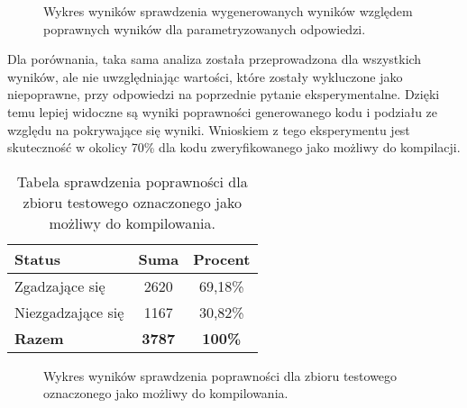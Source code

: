 \begin{figure}[H]
\centering
{}
\caption{Wykres wyników sprawdzenia wygenerowanych wyników względem poprawnych wyników dla parametryzowanych odpowiedzi.}\label{rys:plama2f}
\end{figure}

Dla porównania, taka sama analiza została przeprowadzona dla wszystkich wyników, ale nie uwzględniając wartości, które zostały wykluczone jako niepoprawne, przy odpowiedzi na poprzednie pytanie eksperymentalne. Dzięki temu lepiej widoczne są wyniki poprawności generowanego kodu i podziału ze względu na pokrywające się wyniki. Wnioskiem z tego eksperymentu jest skuteczność w okolicy 70\% dla kodu zweryfikowanego jako możliwy do kompilacji.

\begin{table}[ht]
\caption{Tabela sprawdzenia poprawności dla zbioru testowego oznaczonego jako możliwy do kompilowania.}\label{tab:tabela7}
\centering%
\begin{tabular}{|l|c|c|}
\hline
\textbf{Status} & \textbf{Suma} & \textbf{Procent} \\
\hline
Zgadzające się & 2620 & 69,18\% \\
\hline
Niezgadzające się & 1167 & 30,82\% \\
\hline
\textbf{Razem} & \textbf{3787} & \textbf{100\%} \\
\hline
\end{tabular}
\end{table}

\begin{figure}[H]
\centering
{}
\caption{Wykres wyników sprawdzenia poprawności dla zbioru testowego oznaczonego jako możliwy do kompilowania.}\label{rys:plama2g}
\end{figure}

